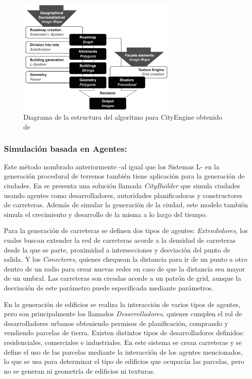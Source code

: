             \begin{figure}[h]
                \centering
                \includegraphics[width=0.7\textwidth]{img/cityengine-diagram.png}
                \caption{Diagrama de la estructura del algoritmo para CityEngine obtenido de \cite{Parish2001}}
            \end{figure}

        \subsubsection{Simulación basada en Agentes:} Este método nombrado anteriormente -al igual que los Sistemas L- en la generación procedural de terrenos también tiene aplicación para la generación de ciudades. En \cite{Watson2003} se presenta una solución llamada \textit{CityBuilder} que simula ciudades usando agentes como desarrolladores, autoridades planificadoras y constructores de carreteras. Además de simular la generación de la ciudad, este modelo también simula el crecimiento y desarrollo de la misma a lo largo del tiempo.

            Para la generación de carreteras se definen dos tipos de agentes: \textit{Extendedores}, los cuales buscan extender la red de carreteras acorde a la densidad de carreteras desde la que se parte, proximidad a intersecciones  y desviación del punto de salida. Y los \textit{Conectores}, quienes chequean la distancia para ir de un punto a otro dentro de un radio para crear nuevas redes en caso de que la distancia sea mayor de un umbral. Las carreteras son creadas acorde a un patrón de grid, aunque la desviación de este parámetro puede especificada mediante parámetros.

            En la generación de edificios se realiza la interacción de varios tipos de agentes, pero son principalmente los llamados \textit{Desarrolladores}, quienes cumplen el rol de desarrolladores urbanos obteniendo permisos de planificación, comprando y vendiendo parcelas de tierra. Existen distintos tipos de desarrolladores definidos: residenciales, comerciales e industriales. En este sistema se crean carreteras y se define el uso de las parcelas mediante la interacción de los agentes mencionados, lo que se usa para determinar el tipo de edificios que ocuparán las parcelas, pero no se generan ni geometría de edificios ni texturas.

